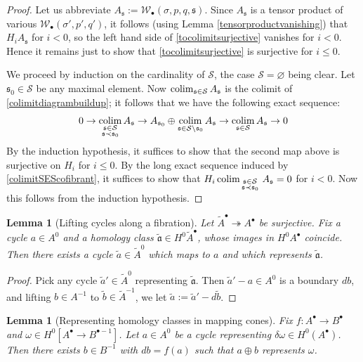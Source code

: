 \documentclass[12pt]{article}
\newtheorem{lemma}[theorem]{Lemma}
\theoremstyle{definition}
\theoremstyle{remark}
\numberwithin{equation}{subsection}
\newcommand{\W}{\mathcal W}
\newcommand{\s}{\mathfrak s}
\newcommand{\SSS}{\mathcal S}
\newcommand{\colim}{\operatornamewithlimits{colim}}
\begin{document}
\begin{proof}
Let us abbreviate $A_\s:=\W_\bullet(\sigma,p,q,\s)$.  Since $A_\s$ is a tensor product of various $\W_\bullet(\sigma',p',q')$, it follows (using Lemma \ref{tensorproductvanishing}) that $H_iA_\s$ for $i<0$, so the left hand side of \eqref{tocolimitsurjective} vanishes for $i<0$.  Hence it remains just to show that \eqref{tocolimitsurjective} is surjective for $i\leq 0$.

We proceed by induction on the cardinality of $\SSS$, the case $\SSS=\varnothing$ being clear.  Let $\s_0\in\SSS$ be any maximal element.  Now $\colim_{\s\in\SSS}A_\s$ is the colimit of \eqref{colimitdiagrambuildup}; it follows that we have the following exact sequence:
\begin{equation}\label{colimitSEScofibrant}
0\to\colim_{\begin{smallmatrix}\s\in\SSS\cr\mathfrak s\prec\s_0\end{smallmatrix}}A_\mathfrak s\to A_{\s_0}\oplus\colim_{\s\in\SSS\setminus\s_0}A_\s\to\colim_{\s\in\SSS}A_\s\to 0
\end{equation}
By the induction hypothesis, it suffices to show that the second map above is surjective on $H_i$ for $i\leq 0$.  By the long exact sequence induced by \eqref{colimitSEScofibrant}, it suffices to show that $H_i\colim_{\begin{smallmatrix}\s\in\SSS\cr\mathfrak s\prec\s_0\end{smallmatrix}}A_\mathfrak s=0$ for $i<0$.  Now this follows from the induction hypothesis.
\end{proof}

\begin{lemma}[Lifting cycles along a fibration]\label{cycleliftinglemma}
Let $\tilde A^\bullet\twoheadrightarrow A^\bullet$ be surjective.  Fix a cycle $a\in A^0$ and a homology class $\tilde{\mathfrak a}\in H^0\tilde A^\bullet$, whose images in $H^0A^\bullet$ coincide.  Then there exists a cycle $\tilde a\in\tilde A^0$ which maps to $a$ and which represents $\tilde{\mathfrak a}$.
\end{lemma}

\begin{proof}
Pick any cycle $\tilde a'\in\tilde A^0$ representing $\tilde{\mathfrak a}$.  Then $\tilde a'-a\in A^0$ is a boundary $db$, and lifting $b\in A^{-1}$ to $\tilde b\in\tilde A^{-1}$, we let $\tilde a:=\tilde a'-d\tilde b$.
\end{proof}

\begin{lemma}[Representing homology classes in mapping cones]\label{mappingconechoiceboundary}
Fix $f:A^\bullet\to B^\bullet$ and $\omega\in H^0[A^\bullet\to B^{\bullet-1}]$.  Let $a\in A^0$ be a cycle representing $\delta\omega\in H^0(A^\bullet)$.  Then there exists $b\in B^{-1}$ with $db=f(a)$ such that $a\oplus b$ represents $\omega$.
\end{lemma}
\end{document}
